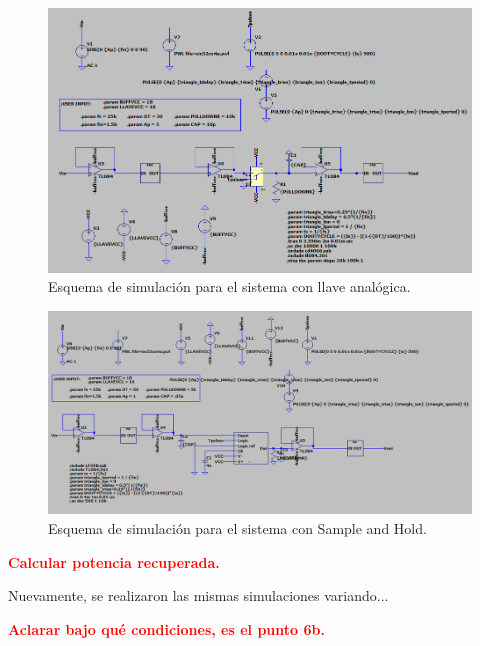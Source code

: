 \begin{figure}[H]
\centering
\includegraphics[width=\textwidth]{ImagenesEjercicio6/SIMULACIONLLAVE.png}
\caption{Esquema de simulación para el sistema con llave analógica.}
\end{figure}

\begin{figure}[H]
\centering
\includegraphics[width=\textwidth]{ImagenesEjercicio6/SIMULACIONSH.png}
\caption{Esquema de simulación para el sistema con Sample and Hold.}
\end{figure}

\textcolor{red}{\textbf{Calcular potencia recuperada.}}

Nuevamente, se realizaron las mismas simulaciones variando...

\textcolor{red}{\textbf{Aclarar bajo qué condiciones, es el punto 6b.}}

